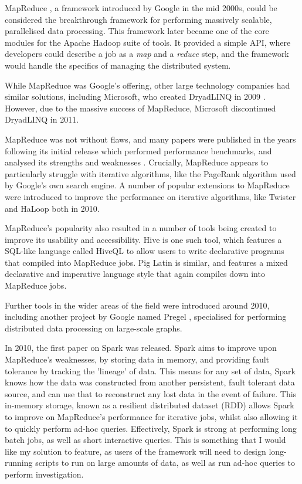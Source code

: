 MapReduce \cite{dean2008mapreduce}, a framework introduced by Google  in the mid 2000s, could be considered the breakthrough framework for performing massively scalable, parallelised data processing. This framework later became one of the core modules for the Apache Hadoop suite of tools. It provided a simple API, where developers could describe a job as a \textit{map} and a \textit{reduce} step, and the framework would handle the specifics of managing the distributed system. 

While MapReduce was Google's offering, other large technology companies had similar solutions, including Microsoft, who created DryadLINQ in 2009 \cite{fetterly2009dryadlinq}. However, due to the massive success of MapReduce, Microsoft discontinued DryadLINQ in 2011.

MapReduce was not without flaws, and many papers were published in the years following its initial release which performed performance benchmarks, and analysed its strengths and weaknesses \cite{lee2012parallel}. Crucially, MapReduce appears to particularly struggle with iterative algorithms, like the PageRank algorithm used by Google's own search engine. A number of popular extensions to MapReduce were introduced to improve the performance on iterative algorithms, like Twister \cite{ekanayake2010twister} and HaLoop \cite{bu2010haloop} both in 2010. 

MapReduce's popularity also resulted in a number of tools being created to improve its usability and accessibility. Hive \cite{thusoo2010hive} is one such tool, which features a SQL-like language called HiveQL to allow users to write declarative programs that compiled into MapReduce jobs. Pig Latin \cite{olston2008pig} is similar, and features a mixed declarative and imperative language style that again compiles down into MapReduce jobs. 

Further tools in the wider areas of the field were introduced around 2010, including another project by Google named Pregel \cite{malewicz2010pregel}, specialised for performing distributed data processing on large-scale graphs.

In 2010, the first paper on Spark \cite{zaharia2010spark} was released. Spark aims to improve upon MapReduce's weaknesses, by storing data in memory, and providing fault tolerance by tracking the 'lineage' of data. This means for any set of data, Spark knows how the data was constructed from another persistent, fault tolerant data source, and can use that to reconstruct any lost data in the event of failure. This in-memory storage, known as a resilient distributed dataset (RDD) \cite{zaharia2012rdd} allows Spark to improve on MapReduce's performance for iterative jobs, whilst also allowing it to quickly perform ad-hoc queries.  Effectively, Spark is strong at performing long batch jobs, as well as short interactive queries. This is something that I would like my solution to feature, as users of the framework will need to design long-running scripts to run on large amounts of data, as well as run ad-hoc queries to perform investigation.

